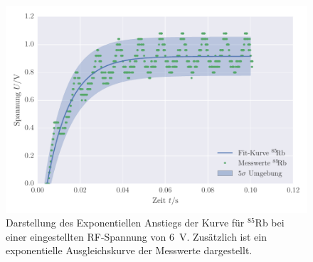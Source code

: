 \FloatBarrier
\begin{figure}[!h]
\centering
\includegraphics[scale=0.85]{../Grafiken/Exponentieller_Anstieg_V6_Rubidium_85.pdf}
\caption{Darstellung des Exponentiellen Anstiegs der Kurve für ${}^{85}\!$Rb bei einer
	eingestellten RF-Spannung von \SI{6}{\volt}. Zusätzlich ist ein exponentielle Ausgleichskurve 
	der Messwerte dargestellt. \label{fig:exponentieller_anstieg_v6_rubidium_85}}
\end{figure}
\FloatBarrier
